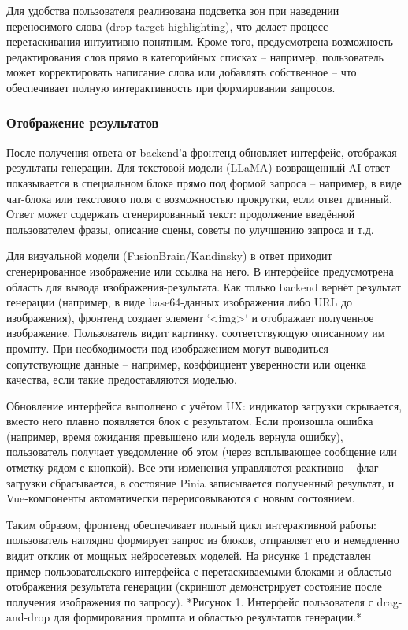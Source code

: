 Для удобства пользователя реализована подсветка зон при наведении переносимого слова (drop target highlighting), что делает процесс перетаскивания интуитивно понятным. Кроме того, предусмотрена возможность редактирования слов прямо в категорийных списках – например, пользователь может корректировать написание слова или добавлять собственное – что обеспечивает полную интерактивность при формировании запросов.

\subsubsection{Отображение результатов}

После получения ответа от backend’а фронтенд обновляет интерфейс, отображая результаты генерации. Для текстовой модели (LLaMA) возвращенный AI-ответ показывается в специальном блоке прямо под формой запроса – например, в виде чат-блока или текстового поля с возможностью прокрутки, если ответ длинный. Ответ может содержать сгенерированный текст: продолжение введённой пользователем фразы, описание сцены, советы по улучшению запроса и т.д.

Для визуальной модели (FusionBrain/Kandinsky) в ответ приходит сгенерированное изображение или ссылка на него. В интерфейсе предусмотрена область для вывода изображения-результата. Как только backend вернёт результат генерации (например, в виде base64-данных изображения либо URL до изображения), фронтенд создает элемент `<img>` и отображает полученное изображение. Пользователь видит картинку, соответствующую описанному им промпту. При необходимости под изображением могут выводиться сопутствующие данные – например, коэффициент уверенности или оценка качества, если такие предоставляются моделью.

Обновление интерфейса выполнено с учётом UX: индикатор загрузки скрывается, вместо него плавно появляется блок с результатом. Если произошла ошибка (например, время ожидания превышено или модель вернула ошибку), пользователь получает уведомление об этом (через всплывающее сообщение или отметку рядом с кнопкой). Все эти изменения управляются реактивно – флаг загрузки сбрасывается, в состояние Pinia записывается полученный результат, и Vue-компоненты автоматически перерисовываются с новым состоянием.

Таким образом, фронтенд обеспечивает полный цикл интерактивной работы: пользователь наглядно формирует запрос из блоков, отправляет его и немедленно видит отклик от мощных нейросетевых моделей. На рисунке 1 представлен пример пользовательского интерфейса с перетаскиваемыми блоками и областью отображения результата генерации (скриншот демонстрирует состояние после получения изображения по запросу). *Рисунок 1. Интерфейс пользователя с drag-and-drop для формирования промпта и областью результатов генерации.*

